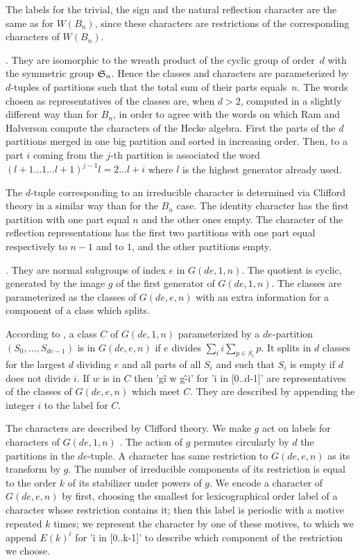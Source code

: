 The  labels  for  the  trivial,  the sign  and  the  natural  reflection
character  are the  same as  for  $W(B_n)$, since  these characters  are
restrictions of the corresponding characters of $W(B_n)$.

.
They  are isomorphic  to  the  wreath product  of  the  cyclic group  of
order~$d$  with the  symmetric  group ${\mathfrak S}_n$.  Hence  the classes  and
characters are  parameterized by $d$-tuples  of partitions such  that the
total sum of their parts equals~$n$. The words chosen as representatives
of the  classes are, when  $d>2$, computed  in a slightly  different way
than  for $B_n$,  in order  to agree  with the  words on  which Ram  and
Halverson compute the  characters of the Hecke algebra.  First the parts
of  the  $d$ partitions  merged  in  one  big  partition and  sorted  in
increasing order. Then,  to a part $i$ coming from  the $j$-th partition
is associated the word $(l+1\ldots1\ldots l+1)^{j-1}l=2\ldots l+i$ where
$l$ is the highest generator already used.

The $d$-tuple  corresponding to  an irreducible character  is determined
via  Clifford theory  in a  similar  way than  for the  $B_n$ case.  The
identity character has  the first partition with one part  equal $n$ and
the other  ones empty. The  character of the  reflection representations
has the first two partitions with  one part equal respectively to $n-1$
and to $1$, and the other partitions empty.

.
They  are normal  subgroups of  index $e$  in $G(de,1,n)$.  The quotient is
cyclic,  generated by the image $g$  of the first generator of $G(de,1,n)$.
The  classes are parameterized  as the classes  of $G(de,e,n)$ with an extra
information for a component of a class which splits.

According  to \cite{Hu85},  a class  $C$ of  $G(de,1,n)$ parameterized  by a
$de$-partition  $(S_0,\ldots,S_{de-1})$  is  in  $G(de,e,n)$ if $e$ divides
$\sum_i  i \sum_{p\in S_i}p$. It splits in  $d$ classes for the largest $d$
dividing $e$ and all parts of all $S_i$ and such that $S_i$ is empty if $d$
does  not  divide  $i$.  If  $w$  is  in  $C$ then 'g\^i w g\^-i' for 'i in
[0..d-1]' are representatives of the classes of $G(de,e,n)$ which meet $C$.
They are described by appending the integer $i$ to the label for $C$.

The  characters are described by Clifford theory. We make $g$ act on labels
for  characters of $G(de,1,n)$  . The action  of $g$ permutes circularly by
$d$  the partitions in the $de$-tuple.  A character has same restriction to
$G(de,e,n)$  as its transform by $g$.  The number of irreducible components
of its restriction is equal to the order $k$ of its stabilizer under powers
of  $g$.  We  encode  a  character  of  $G(de,e,n)$  by first, choosing the
smallest  for lexicographical order label  of a character whose restriction
contains  it; then this label is periodic with a motive repeated $k$ times;
we  represent the  character by  one of  these motives,  to which we append
$E(k)^i$ for 'i in [0..k-1]' to describe which component of the restriction
we choose.

